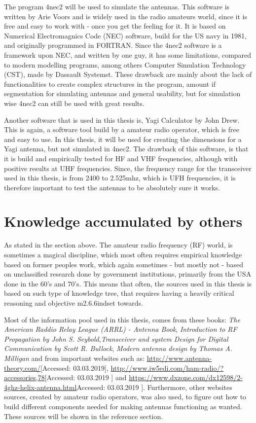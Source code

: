 The program 4nec2\cite{4nec2} will be used to simulate the antennas. This software is written by Arie Voors and is widely used in the radio amateurs world, since it is free and easy to work with - once you get the feeling for it. It is based on Numerical Electromagnics Code (NEC) software\cite{nec}, build for the US navy in 1981, and originally programmed in FORTRAN\cite{Fortran}. Since the 4nec2 software is a framework upon NEC, and written by one guy, it has some limitations, compared to modern modelling programs, among others Computer Simulation Technology (CST), made by Dassault Systemst\cite{Dassault}. These drawback are mainly about the lack of functionalities to create complex structures in the program, amount if segmentation for simulating antennas and general usability, but for simulation wise 4nec2 can still be used with great results. 

Another software that is used in this thesis is, Yagi Calculator by John Drew\cite{yagical}. This is again, a software tool build by a amateur radio operator, which is free and easy to use. In this thesis, it will be used for creating the dimensions for a Yagi antenna, but not simulated in 4nec2. The drawback of this software, is that it is build and empirically tested for HF and VHF frequencies, although with positive results at UHF frequencies. Since, the frequency range for the transceiver used in this thesis, is from 2400 to 2.525mhz, which is UFH frequencies, it is therefore important to test the antennas to be absolutely sure it works.  

\section{Knowledge accumulated by others}
As stated in the section above. The amateur radio frequency (RF) world, is sometimes a magical discipline, which most often requires empirical knowledge based on former peoples work, which again sometimes - but mostly not - based on unclassified research done by government institutions, primarily from the USA done in the 60's and 70's. This means that often, the sources used in this thesis is based on such type of knowledge tree, that requires having a heavily critical reasoning and objective m2.6.6indset towards.

Most of the information pool used in this thesis, comes from these books: \textit{The American Raddio Relay League (ARRL) - Antenna Book}\cite{ARRL}, \textit{Introduction to RF Propagation by John S. Seybold}\cite{RFpropagation},\textit{Transceiver and system Design for Digital Communication by Scott R. Bullock}\cite{TransceiverBook}, \textit{Modern antenna design by Thomas A. Milligan}\cite{modernantenna} and from important websites such as: \url{http://www.antenna-theory.com/}[Accessed: 03.03.2019], \url{http://www.iw5edi.com/ham-radio/?accessories,78}[Accessed: 03.03.2019 ] and \url{	https://www.dxzone.com/dx12598/2-4ghz-helix-antenna.html}Accessed: 03.03.2019 ]. Furthermore, other websites sources, created by amateur radio operators, was also used, to figure out how to build different components needed for making  antennas functioning as wanted. These sources will be shown in the reference section.

